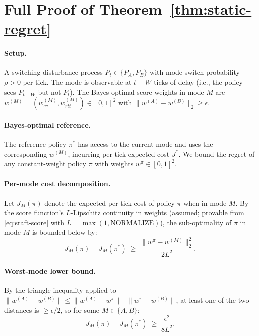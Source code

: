 
\section{Full Proof of Theorem~\ref{thm:static-regret}}
\label{app:static-regret-full}

\paragraph{Setup.} A switching disturbance process
$P_t \in \{P_A, P_B\}$ with mode-switch probability $\rho > 0$ per
tick. The mode is observable at $t-W$ ticks of delay (i.e., the policy
sees $P_{t-W}$ but not $P_t$). The Bayes-optimal score weights in mode
$M$ are $w^{(M)} = (w_{cc}^{(M)}, w_{rtt}^{(M)}) \in [0,1]^2$ with
$\|w^{(A)} - w^{(B)}\|_2 \ge \epsilon$.

\paragraph{Bayes-optimal reference.} The reference policy $\pi^*$ has
access to the current mode and uses the corresponding $w^{(M)}$,
incurring per-tick expected cost $J^*$. We bound the regret of any
constant-weight policy $\pi$ with weights $w^\pi \in [0,1]^2$.

\paragraph{Per-mode cost decomposition.} Let $J_M(\pi)$ denote the
expected per-tick cost of policy $\pi$ when in mode $M$. By the score
function's $L$-Lipschitz continuity in weights (assumed; provable from
\eqref{eq:sraft-score} with $L = \max(1, \mathrm{NORMALIZE})$), the
sub-optimality of $\pi$ in mode $M$ is bounded below by:
\begin{equation}
  J_M(\pi) - J_M(\pi^*) \;\ge\; \frac{\|w^\pi - w^{(M)}\|_2^2}{2L^2}.
\end{equation}

\paragraph{Worst-mode lower bound.} By the triangle inequality applied
to $\|w^{(A)} - w^{(B)}\| \le \|w^{(A)} - w^\pi\| + \|w^\pi - w^{(B)}\|$,
at least one of the two distances is $\ge \epsilon/2$, so for some
$M \in \{A, B\}$:
\begin{equation}
  J_M(\pi) - J_M(\pi^*) \;\ge\; \frac{\epsilon^2}{8L^2}.
\end{equation}

